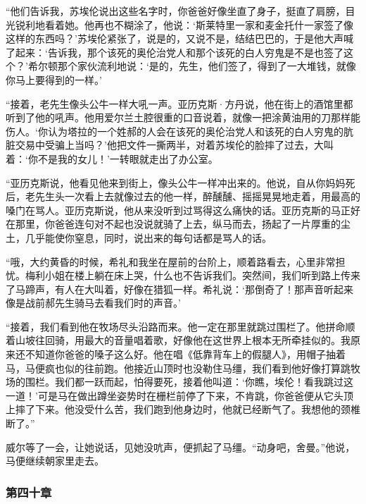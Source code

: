 \par “他们告诉我，苏埃伦说出这些名字时，你爸爸好像坐直了身子，挺直了肩膀，目光锐利地看着她。他再也不糊涂了，他说：‘斯莱特里一家和麦金托什一家签了像这样的东西吗？’苏埃伦紧张了，说是的，又说不是，结结巴巴的，于是他大声喊了起来：‘告诉我，那个该死的奥伦治党人和那个该死的白人穷鬼是不是也签了这个？’希尔顿那个家伙流利地说：‘是的，先生，他们签了，得到了一大堆钱，就像你马上要得到的一样。’
\par “接着，老先生像头公牛一样大吼一声。亚历克斯·方丹说，他在街上的酒馆里都听到了他的吼声。他用爱尔兰土腔很重的口音说着，就像一把涂黄油用的刀那样能伤人。‘你认为塔拉的一个姓郝的人会在该死的奥伦治党人和该死的白人穷鬼的肮脏交易中受骗上当吗？’他把文件一撕两半，对着苏埃伦的脸摔了过去，大叫着：‘你不是我的女儿！’一转眼就走出了办公室。
\par “亚历克斯说，他看见他来到街上，像头公牛一样冲出来的。他说，自从你妈妈死后，老先生头一次看上去就像过去的他一样，醉醺醺、摇摇晃晃地走着，用最高的嗓门在骂人。亚历克斯说，他从来没听到过骂得这么痛快的话。亚历克斯的马正好在那里，你爸爸连句对不起也没说就骑了上去，纵马而去，扬起了一片厚重的尘土，几乎能使你窒息，同时，说出来的每句话都是骂人的话。
\par “哦，大约黄昏的时候，希礼和我坐在屋前的台阶上，顺着路看去，心里非常担忧。梅利小姐在楼上躺在床上哭，什么也不告诉我们。突然间，我们听到路上传来了马蹄声，有人在大叫着，好像在猎狐一样。希礼说：‘那倒奇了！那声音听起来像是战前郝先生骑马去看我们时的声音。’
\par “接着，我们看到他在牧场尽头沿路而来。他一定在那里就跳过围栏了。他拼命顺着山坡往回骑，用最大的音量唱着歌，好像他在这世界上根本无所牵挂似的。我原来还不知道你爸爸的嗓子这么好。他在唱《低靠背车上的假腿人》，用帽子抽着马，马便疯也似的往前跑。他接近山顶时也没勒住马缰，我们看到他好像打算跳牧场的围栏。我们都一跃而起，怕得要死，接着他叫道：‘你瞧，埃伦！看我跳过这一道！’可是马在做出蹲坐姿势时在栅栏前停了下来，不肯跳，你爸爸便从它头顶上摔了下来。他没受什么苦，我们跑到他身边时，他就已经断气了。我想他的颈椎断了。”
\par 威尔等了一会，让她说话，见她没吭声，便抓起了马缰。“动身吧，舍曼。”他说，马便继续朝家里走去。

\subsubsection{第四十章}

